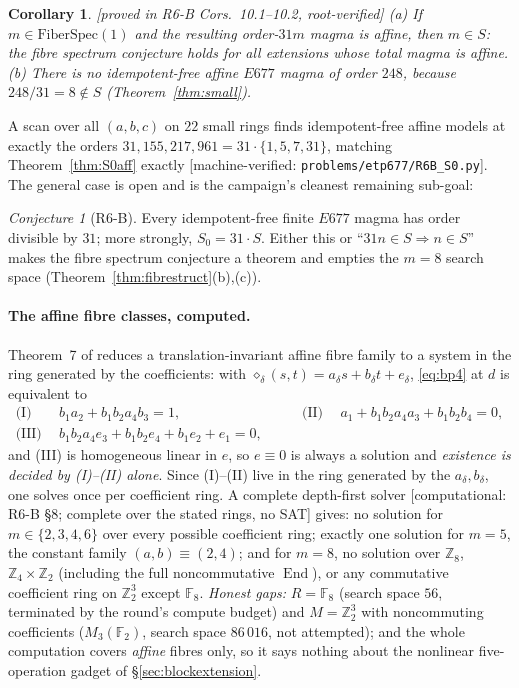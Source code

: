 \documentclass[11pt]{article}
\theoremstyle{plain}
\newtheorem{corollary}[theorem]{Corollary}
\theoremstyle{definition}
\theoremstyle{remark}
\newtheorem*{conjecture*}{Conjecture}
\numberwithin{equation}{section}
\newcommand{\Z}{\mathbb{Z}}
\newcommand{\F}{\mathbb{F}}
\newcommand{\End}{\operatorname{End}}
\newcommand{\statusbox}[1]{{\small\sloppy\textsf{[#1]}}}
\newcommand{\MV}[1]{\statusbox{machine-verified: \texttt{#1}}}
\newcommand{\PROVED}[1]{\statusbox{proved in #1, root-verified}}
\newcommand{\COMP}[1]{\statusbox{computational: #1}}
\begin{document}
\begin{corollary}\label{cor:S0consequences}
\PROVED{R6-B Cors.~10.1--10.2}
(a) If $m\in\mathrm{FiberSpec}(1)$ and the resulting order-$31m$ magma is affine,
then $m\in S$: the fibre spectrum conjecture holds for all extensions whose total
magma is affine. (b) There is no idempotent-free \emph{affine} $E677$ magma of
order $248$, because $248/31 = 8\notin S$ (Theorem~\ref{thm:small}).
\end{corollary}

A scan over all $(a,b,c)$ on $22$ small rings finds idempotent-free affine models
at exactly the orders $31,155,217,961 = 31\cdot\{1,5,7,31\}$, matching
Theorem~\ref{thm:S0aff} exactly \MV{problems\slash etp677\slash R6B\_S0.py}. The
general case is open and is the campaign's cleanest remaining sub-goal:

\begin{conjecture*}[R6-B]
Every idempotent-free finite $E677$ magma has order divisible by $31$; more
strongly, $S_0 = 31\cdot S$. Either this or ``$31n\in S\Rightarrow n\in S$'' makes
the fibre spectrum conjecture a theorem and empties the $m = 8$ search space
(Theorem~\ref{thm:fibrestruct}(b),(c)).
\end{conjecture*}

\paragraph{The affine fibre classes, computed.} Theorem~7 of \cite{R6B} reduces a
translation-invariant affine fibre family to a system in the ring generated by the
coefficients: with $\diamond_\delta(s,t) = a_\delta s+b_\delta t+e_\delta$,
\eqref{eq:bp4} at $d$ is equivalent to
\[
\begin{aligned}
  \text{(I)}\ &\ b_1a_2+b_1b_2a_4b_3 = 1, &\qquad
  \text{(II)}\ &\ a_1+b_1b_2a_4a_3+b_1b_2b_4 = 0,\\
  \text{(III)}\ &\ b_1b_2a_4e_3+b_1b_2e_4+b_1e_2+e_1 = 0, &&
\end{aligned}
\]
and (III) is homogeneous linear in $e$, so $e\equiv0$ is always a solution and
\emph{existence is decided by (I)--(II) alone}. Since (I)--(II) live in the ring
generated by the $a_\delta,b_\delta$, one solves once per coefficient ring. A
complete depth-first solver
\COMP{R6-B \S8; complete over the stated rings, no SAT}
gives: no solution for $m\in\{2,3,4,6\}$ over every possible coefficient ring;
exactly one solution for $m = 5$, the constant family $(a,b)\equiv(2,4)$; and for
$m = 8$, no solution over $\Z_8$, $\Z_4\times\Z_2$ (including the full
noncommutative $\End$), or any commutative coefficient ring on $\Z_2^3$ except
$\F_8$. \emph{Honest gaps:} $R = \F_8$ (search space $56$, terminated by the
round's compute budget) and $M = \Z_2^3$ with noncommuting coefficients
($M_3(\F_2)$, search space $86\,016$, not attempted); and the whole computation
covers \emph{affine} fibres only, so it says nothing about the nonlinear
five-operation gadget of \S\ref{sec:blockextension}.
\end{document}
